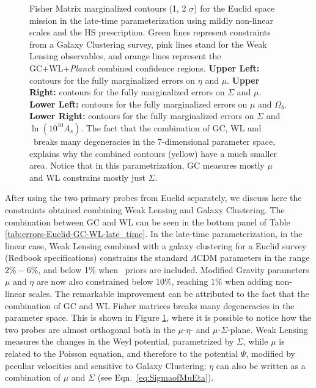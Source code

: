\begin{figure}[htbp]
\caption[Fisher confidence contours for a Euclid GC and WL forecast.]{\label{fig:DE+Planck-ellipses-mu-sig-eta} 
Fisher Matrix marginalized contours
(1, 2 $\sigma$) for the Euclid space mission in the late-time parameterization
using mildly non-linear scales and the HS prescription. Green lines
represent constraints from a Galaxy Clustering survey, pink lines
stand for the Weak Lensing observables, and orange lines represent the GC+WL+{\it Planck} combined confidence
regions. \textbf{Upper Left: }contours for the fully marginalized
errors on $\eta$ and $\mu$. \textbf{Upper Right: }contours for the
fully marginalized errors on $\Sigma$ and $\mu$.\textbf{ Lower Left:
}contours for the fully marginalized errors on $\mu$ and $\Omega_{b}$.
\textbf{Lower Right: }contours for the fully marginalized errors on
$\Sigma$ and $\ln(10^10 A_{s})$. The fact that the combination of GC, WL and \planck\
breaks many degeneracies in the 7-dimensional parameter space, explains why
the combined contours (yellow) have a much smaller area. Notice that in this parametrization, 
GC measures mostly $\mu$ and WL constrains mostly just $\Sigma$.}
\end{figure}

After using the two primary probes from Euclid
separately, we discuss here the constraints obtained combining Weak
Lensing and Galaxy Clustering. 
The combination between GC and
WL can be seen in the bottom panel of Table
\ref{tab:errors-Euclid-GC-WL-late_time}.
In the late-time parameterization, in the linear case, Weak Lensing combined with a galaxy
clustering for a Euclid survey (Redbook specifications) constrains the standard $\Lambda$CDM parameters
in the range $2 \% - 6 \%$, and below 1$\%$ when \planck\ priors are included. Modified Gravity parameters $\mu$ and $\eta$ are now also constrained below 10$\%$, reaching $1\%$ when adding non-linear scales.
The remarkable improvement can be attributed
to the fact that the combination of GC and WL Fisher matrices breaks
many degeneracies in the parameter space. This is shown in Figure
\ref{fig:DE+Planck-ellipses-mu-sig-eta}, where it is possible to notice
how the two probes are almost orthogonal both in the $\mu$-$\eta$-
and $\mu$-$\Sigma$-plane. Weak Lensing measures
the changes in the Weyl potential, parametrized by $\Sigma$, while $\mu$ is related to the Poisson equation, and therefore to the potential $\Psi$, modified by peculiar velocities and sensitive to Galaxy Clustering; $\eta$ can also be written as a combination of $\mu$ and $\Sigma$ (see Eqn.\ \ref{eq:SigmaofMuEta}). 


